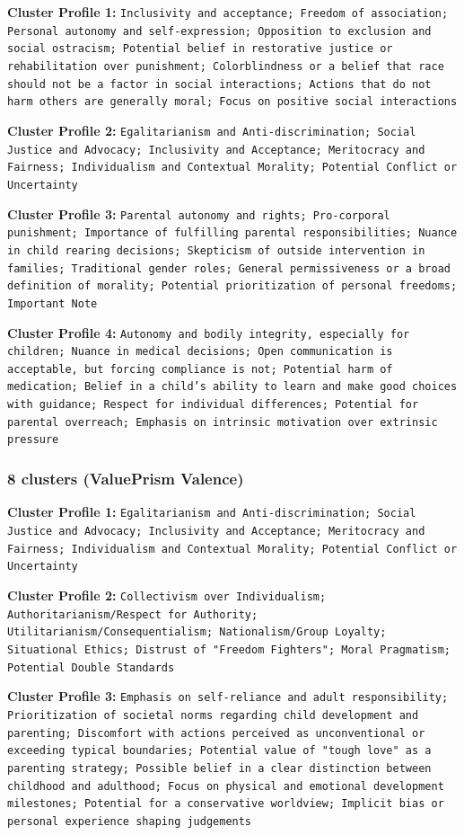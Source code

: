 \documentclass[11pt]{article}
\begin{document}
\textbf{Cluster Profile 1:} \texttt{Inclusivity and acceptance; Freedom of association; Personal autonomy and self-expression; Opposition to exclusion and social ostracism; Potential belief in restorative justice or rehabilitation over punishment; Colorblindness or a belief that race should not be a factor in social interactions; Actions that do not harm others are generally moral; Focus on positive social interactions}

\textbf{Cluster Profile 2:} \texttt{Egalitarianism and Anti-discrimination; Social Justice and Advocacy; Inclusivity and Acceptance; Meritocracy and Fairness; Individualism and Contextual Morality; Potential Conflict or Uncertainty}

\textbf{Cluster Profile 3:} \texttt{Parental autonomy and rights; Pro-corporal punishment; Importance of fulfilling parental responsibilities; Nuance in child rearing decisions; Skepticism of outside intervention in families; Traditional gender roles; General permissiveness or a broad definition of morality; Potential prioritization of personal freedoms; Important Note}

\textbf{Cluster Profile 4:} \texttt{Autonomy and bodily integrity, especially for children; Nuance in medical decisions; Open communication is acceptable, but forcing compliance is not; Potential harm of medication; Belief in a child's ability to learn and make good choices with guidance; Respect for individual differences; Potential for parental overreach; Emphasis on intrinsic motivation over extrinsic pressure}

\subsubsection{8 clusters (ValuePrism Valence)}

\textbf{Cluster Profile 1:} \texttt{Egalitarianism and Anti-discrimination; Social Justice and Advocacy; Inclusivity and Acceptance; Meritocracy and Fairness; Individualism and Contextual Morality; Potential Conflict or Uncertainty}

\textbf{Cluster Profile 2:} \texttt{Collectivism over Individualism; Authoritarianism/Respect for Authority; Utilitarianism/Consequentialism; Nationalism/Group Loyalty; Situational Ethics; Distrust of "Freedom Fighters"; Moral Pragmatism; Potential Double Standards}

\textbf{Cluster Profile 3:} \texttt{Emphasis on self-reliance and adult responsibility; Prioritization of societal norms regarding child development and parenting; Discomfort with actions perceived as unconventional or exceeding typical boundaries; Potential value of "tough love" as a parenting strategy; Possible belief in a clear distinction between childhood and adulthood; Focus on physical and emotional development milestones; Potential for a conservative worldview; Implicit bias or personal experience shaping judgements}
\end{document}
